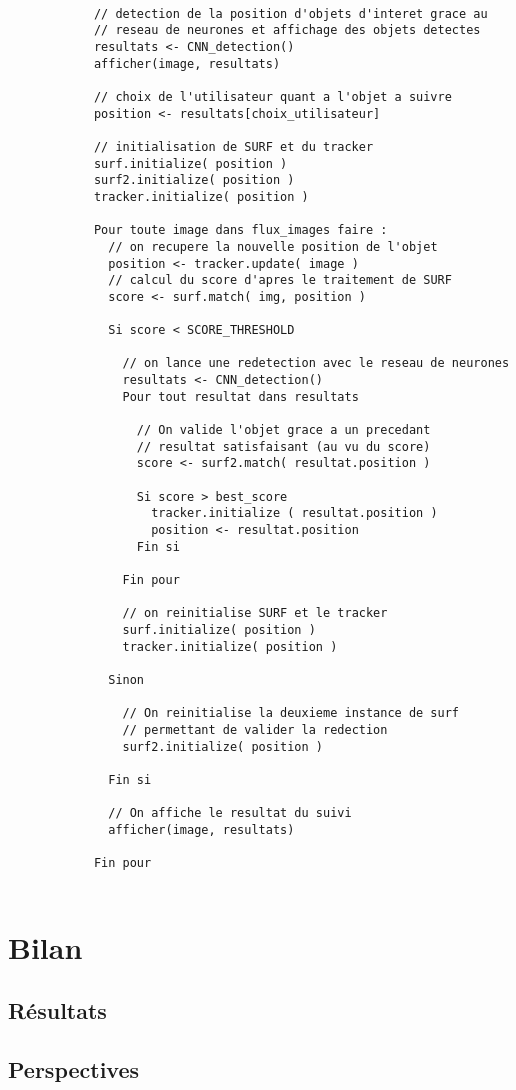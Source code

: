 			\begin{lstlisting}
			
			// detection de la position d'objets d'interet grace au
			// reseau de neurones et affichage des objets detectes
			resultats <- CNN_detection()
			afficher(image, resultats)
			
			// choix de l'utilisateur quant a l'objet a suivre
			position <- resultats[choix_utilisateur]
			
			// initialisation de SURF et du tracker
			surf.initialize( position )  
			surf2.initialize( position )  
			tracker.initialize( position )
			
			Pour toute image dans flux_images faire : 
			  // on recupere la nouvelle position de l'objet 
			  position <- tracker.update( image )
			  // calcul du score d'apres le traitement de SURF
			  score <- surf.match( img, position )
			  
			  Si score < SCORE_THRESHOLD
			    
			    // on lance une redetection avec le reseau de neurones
			    resultats <- CNN_detection()
			    Pour tout resultat dans resultats
			    
			      // On valide l'objet grace a un precedant
			      // resultat satisfaisant (au vu du score)
			      score <- surf2.match( resultat.position )
			      
			      Si score > best_score
			        tracker.initialize ( resultat.position )
			        position <- resultat.position
			      Fin si
			      
			    Fin pour
			    
			    // on reinitialise SURF et le tracker
			    surf.initialize( position )  
			    tracker.initialize( position )
			  
			  Sinon
			  
			    // On reinitialise la deuxieme instance de surf
			    // permettant de valider la redection
			    surf2.initialize( position )  
			  
			  Fin si
			
			  // On affiche le resultat du suivi
			  afficher(image, resultats)
			
			Fin pour
			
			\end{lstlisting}
			
	\section{Bilan}

		\subsection{Résultats}
		
		\subsection{Perspectives}
